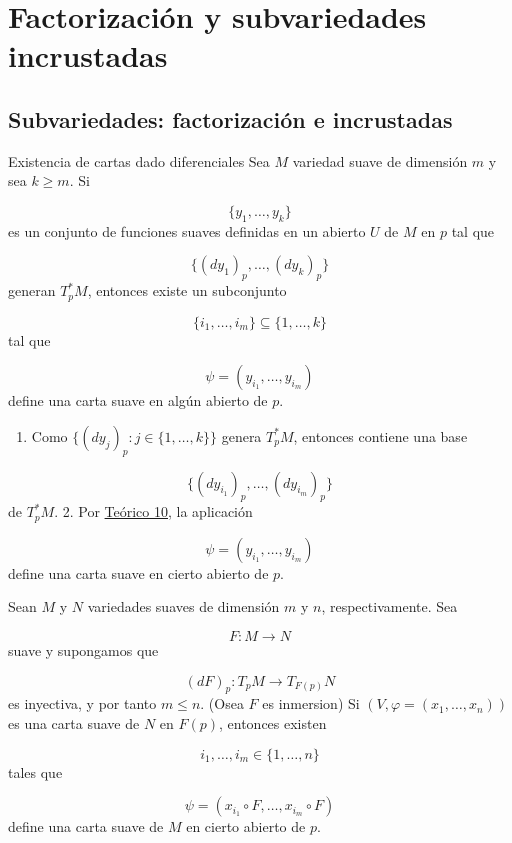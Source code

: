 \chapter{Factorización y subvariedades incrustadas}
\label{ch:teo-11}
\section{Subvariedades: factorización e incrustadas}
\begin{bookproposition}{Existencia de cartas dado diferenciales}
Sea $M$ variedad suave de dimensión $m$ y sea $k\ge m$. Si

\[
\{y_1,\ldots,y_k\}
\]
es un conjunto de funciones suaves definidas en un abierto $U$ de $M$ en $p$ tal que

\[
\{(dy_1)_p,\ldots,(dy_k)_p\}
\]
generan $T_p^\ast M$, entonces existe un subconjunto

\[
\{i_1,\ldots,i_m\}\subseteq\{1,\ldots,k\}
\]
tal que

\[
\psi=(y_{i_1},\ldots,y_{i_m})
\]
define una carta suave en algún abierto de $p$.

\end{bookproposition}
\begin{bookproof}{}
\begin{enumerate}
\item Como $\{(dy_j)_p:j\in\{1,\ldots,k\}\}$ genera $T_p^\ast M$, entonces contiene una base
\end{enumerate}
\[
\{(dy_{i_1})_p,\ldots,(dy_{i_m})_p\}
\]
de $T_p^\ast M$. 2. Por \hyperref[blk:2b23b2]{Teórico 10}, la aplicación

\[
\psi=(y_{i_1},\ldots,y_{i_m})
\]
define una carta suave en cierto abierto de $p$.

\bookqed
\end{bookproof}
\label{blk:existencia-cartas-dado-diferenciales}
\label{blk:49431b}
\begin{bookcorollary}{}
Sean $M$ y $N$ variedades suaves de dimensión $m$ y $n$, respectivamente. Sea

\[
F:M\to N
\]
suave y supongamos que

\[
(dF)_p:T_pM\to T_{F(p)}N
\]
es inyectiva, y por tanto $m\le n$. (Osea $F$ es inmersion) Si $(V,\varphi=(x_1,\ldots,x_n))$ es una carta suave de $N$ en $F(p)$, entonces existen

\[
i_1,\ldots,i_m\in\{1,\ldots,n\}
\]
tales que

\[
\psi=(x_{i_1}\circ F,\ldots,x_{i_m}\circ F)
\]
define una carta suave de $M$ en cierto abierto de $p$.

\end{bookcorollary}
